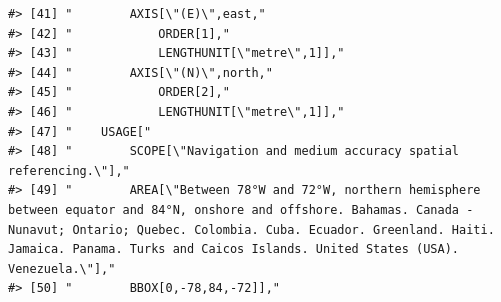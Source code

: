\documentclass[
]{book}
\begin{document}
\begin{verbatim}
#> [41] "        AXIS[\"(E)\",east,"                                                                                                                                                                                                                                                     
#> [42] "            ORDER[1],"                                                                                                                                                                                                                                                          
#> [43] "            LENGTHUNIT[\"metre\",1]],"                                                                                                                                                                                                                                          
#> [44] "        AXIS[\"(N)\",north,"                                                                                                                                                                                                                                                    
#> [45] "            ORDER[2],"                                                                                                                                                                                                                                                          
#> [46] "            LENGTHUNIT[\"metre\",1]],"                                                                                                                                                                                                                                          
#> [47] "    USAGE["                                                                                                                                                                                                                                                                     
#> [48] "        SCOPE[\"Navigation and medium accuracy spatial referencing.\"],"                                                                                                                                                                                                        
#> [49] "        AREA[\"Between 78°W and 72°W, northern hemisphere between equator and 84°N, onshore and offshore. Bahamas. Canada - Nunavut; Ontario; Quebec. Colombia. Cuba. Ecuador. Greenland. Haiti. Jamaica. Panama. Turks and Caicos Islands. United States (USA). Venezuela.\"],"
#> [50] "        BBOX[0,-78,84,-72]],"                                                                                                                                                                                                                                                   

\end{verbatim}
\end{document}
